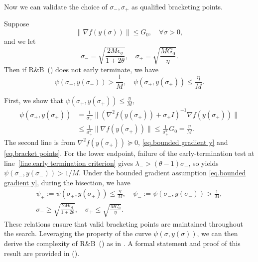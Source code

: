 \documentclass[moor,sglanonrev]{informs4}
\begin{document}
Now we can validate the choice of $\sigma_-,\sigma_+$ as qualified bracketing points.
\begin{lemma}
    \label{lem.bracketing points}
    Suppose
    \begin{equation}\label{eq.bounded gradient y}
        \|\nabla f(y(\sigma))\|\leq G_0, \quad \forall \sigma>0,
    \end{equation}
    and we let
    \begin{equation}
        \label{eq.bracket points}
        \sigma_- = \sqrt{\frac{2M\epsilon_g}{1+2\theta}}, \quad \sigma_+ = \sqrt{\frac{MG_0}{\eta}}.
    \end{equation}
    Then if \textnormal{R\&B}~() does not early terminate, we have
    \begin{equation*}
        \psi\left (\sigma_-,y(\sigma_-)\right) >\frac{1}{M}, \quad \psi\left (\sigma_+,y(\sigma_+)\right) \leq\frac{\eta}{M}.
    \end{equation*}
\end{lemma}
First, we show that $\psi(\sigma_+,y(\sigma_+))\leq\frac{\eta}{M}$,
\begin{equation*}
    \begin{aligned}
        \psi(\sigma_+,y(\sigma_+)) & = \frac{1}{\sigma_+} \|(\nabla^2 f(y(\sigma_+))+\sigma_+ I)^{-1}\nabla f(y(\sigma_+))\|            \\
                                   & \leq \frac{1}{\sigma_+^2}\|\nabla f(y(\sigma_+))\| \leq \frac{1}{\sigma_+^2} G_0 = \frac{\eta}{M}.
    \end{aligned}
\end{equation*}
The second line is from $\nabla^2 f(y(\sigma_+))\succeq 0$, \eqref{eq.bounded gradient y} and \eqref{eq.bracket points}. For the lower endpoint, failure of the early-termination test at line~\ref{line.early termination criterion} gives $\lambda_- > (\theta-1)\sigma_-$, so  yields
\(
    \psi(\sigma_-,y(\sigma_-))>1/M.
\)
\Halmos \endproof
Under the bounded gradient assumption \eqref{eq.bounded gradient y}, during the bisection, we have
\begin{gather}
    \label{eq.bisection condition}
    \psi_+:=\psi(\sigma_+,y(\sigma_+))\leq\frac{\eta}{M}, \quad \psi_-:=\psi(\sigma_-,y(\sigma_-))>\frac{1}{M},\\
    \label{eq.bracket points condition} \sigma_- \geq \sqrt{\frac{2M\epsilon_g}{1+2\theta}}, \quad \sigma_+ \leq \sqrt{\frac{MG_0}{\eta}}.
\end{gather}
These relations ensure that valid bracketing points are maintained throughout the search. Leveraging the property of the curve $\psi(\sigma,y(\sigma))$, we can then derive the complexity of R\&B~() as in . A formal statement and proof of this result are provided in  ().
\end{document}
